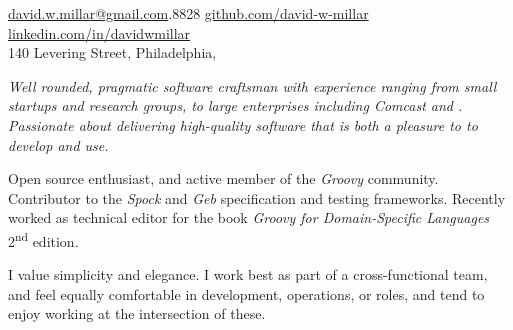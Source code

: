 \documentclass[10pt,a4paper]{article}
\begin{document}
\sloppy


\nobreakvspace{0.3em}  %
\noindent\href{mailto:david.w.millar.at.gmail.com}{david.w.millar\mbox{}@\mbox{}gmail.com}\hspace{1.7mm}.8828
\sbull
\href{http://www.github.com/david-w-millar}{github.com/david-w-millar}\sbull
\href{http://www.linkedin.com/in/davidwmillar}{linkedin.com/in/davidwmillar}
\\
140 Levering Street, Philadelphia,

\spacedhrule{0.9em}{-0.4em}


\vspace{-1.3em}  %
\begin{multicols}{2}  %
  \emph{
    Well rounded, pragmatic software craftsman with experience ranging from small startups and research groups, to large enterprises including Comcast and .
    Passionate about delivering high-quality software that is both a pleasure to to develop and use.
  }

Open source enthusiast, and active member of the \emph{Groovy} community.
Contributor to the \emph{Spock} and \emph{Geb} specification and testing frameworks.
Recently worked as technical editor for the book \emph{Groovy for Domain-Specific Languages}  2\textsuperscript{nd} edition.

I value simplicity and elegance.
I work best as part of a cross-functional team, and feel equally comfortable in development, operations, or  roles, and tend to enjoy working at the intersection of these.

\end{multicols}

\spacedhrule{0em}{-0.4em}

\end{document}

